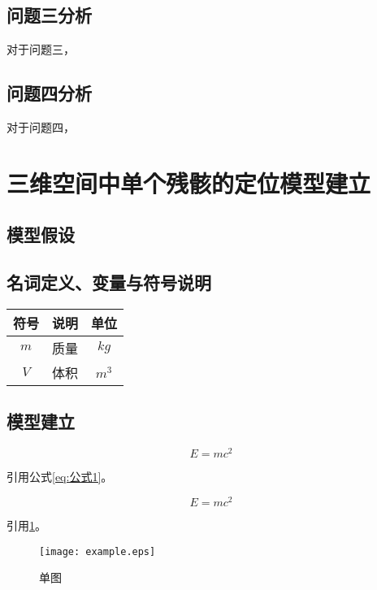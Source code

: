 \documentclass[withoutpreface,bwprint]{cumcmthesis}
\begin{document}
\subsection{问题三分析}
对于问题三，

\subsection{问题四分析}
对于问题四，


\section{三维空间中单个残骸的定位模型建立}

\subsection{模型假设}

\subsection{名词定义、变量与符号说明}

\begin{table}[H]
\centering
\begin{tabularx}{\textwidth}{CLC}
\toprule
符号    & 说明    & 单位 \\
\midrule
$m     $& 质量 & $kg$ \\
$V     $& 体积 & $m^3$ \\
\bottomrule
\end{tabularx}
\label{tab:符号说明}
\end{table}


\subsection{模型建立}


$$
E = mc^2
$$

引用公式\cref{eq:公式1}。

\begin{equation}
\label{eq:公式1}
E = mc^2
\end{equation}

引用\cref{fig:单图}。

\begin{figure}[ht]
\centering
\texttt{[image: example.eps]}
\caption{单图}
\label{fig:单图}
\end{figure}
\end{document}

